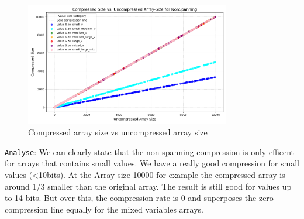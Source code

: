 \documentclass[11pt, a4paper]{article}
\begin{document}
	\begin{figure}[H]%
		\centering
		\includegraphics[width=0.8\textwidth]{Grafics/NonSpanning/NonSpanningefficency.png}
		\caption{Compressed array size vs uncompressed array size}
		\label{fig:nonspanning_efficiency}
	\end{figure}
	
	\texttt{Analyse}: We can clearly state that the non spanning compression is only efficent for arrays that contains small values. We have a really good compression for small values (<10bits). At the Array size 10000 for example the compressed array is around 1/3 smaller than the original array. The result is still good for values up to 14 bits. But over this, the compression rate is 0 and superposes the zero compression line equally for the mixed variables arrays.  
	
\end{document}
